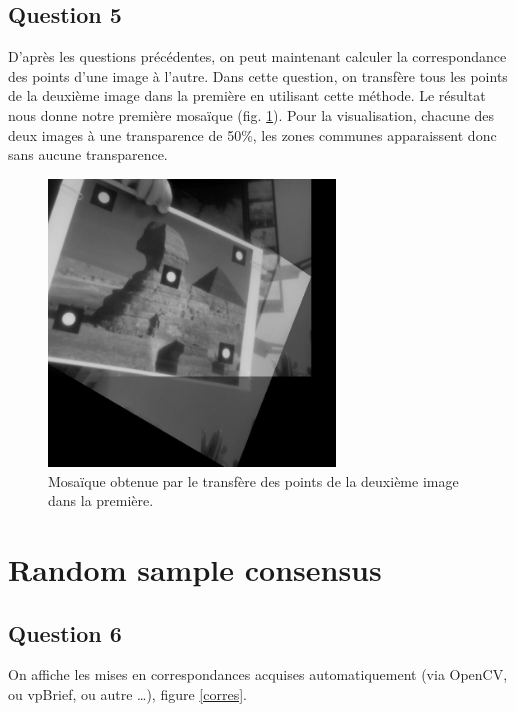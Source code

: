 \documentclass{article}
\begin{document}
\subsection{Question 5}
D'après les questions précédentes, on peut maintenant calculer la correspondance des points d'une image à
l'autre. Dans cette question, on transfère tous les points de la deuxième image dans la première en utilisant
cette méthode. Le résultat nous donne notre première mosaïque (fig. \ref{mosaique}). Pour la visualisation,
chacune des deux images à une transparence de 50\%, les zones communes apparaissent donc sans aucune
transparence.

\begin{figure}[!ht]
    \center
    \includegraphics[width=0.68\textwidth]{img/resultat_mosaic.jpg}
    \caption{Mosaïque obtenue par le transfère des points de la deuxième image dans la première.}
    \label{mosaique}
\end{figure}

\section{Random sample consensus}

\subsection{Question 6}
On affiche les mises en correspondances acquises automatiquement (via OpenCV, ou vpBrief, ou autre \ldots),
figure \ref{corres}.
\end{document}
